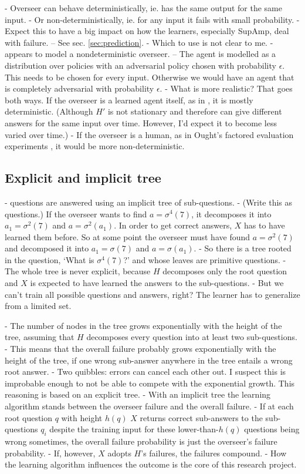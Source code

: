 \documentclass{farlamp}
\begin{document}
- Overseer can behave deterministically, ie. has the same output for the same
input.
- Or non-deterministically, ie. for any input it fails with small probability.
- Expect this to have a big impact on how the learners, especially SupAmp, deal
with failure. – See sec. \ref{sec:prediction}.
- \OQ Which to use is not clear to me.
    - \textcite{ChriRelAmp} appears to model a nondeterministic overseer. – The
    agent is modelled as a distribution over policies with an adversarial policy
    chosen with probability $\epsilon$. This needs to be chosen for every input.
    Otherwise we would have an agent that is completely adversarial with
    probability $\epsilon$.
    - What is more realistic? That goes both ways. If the overseer is a learned
    agent itself, as in \textcite{CSASupAmp}, it is mostly deterministic.
    (Although $H'$ is not stationary and therefore can give different answers
    for the same input over time. However, I'd expect it to become less varied
    over time.)
    - If the overseer is a human, as in Ought's factored evaluation experiments
    \parencite{StuhDelCog}, it would be more non-deterministic.


\subsection{Explicit and implicit tree}

- questions are answered using an implicit tree of sub-questions.
- (Write this as questions.) If the overseer wants to find $a = \sigma^4(7)$, it
decomposes it into $a_1 = \sigma^2(7)$ and $a = \sigma^2(a_1)$. In order to get
correct answers, $X$ has
to have learned them before. So at some point the overseer must have found $a =
\sigma^2(7)$ and decomposed it into $a_1 = \sigma(7)$ and $a = \sigma(a_1)$.
- So there is a tree rooted in the question, ‘What is $\sigma^4(7)$?’ and whose
leaves are primitive questions.
- The whole tree is never explicit, because $H$ decomposes only the root
question and $X$ is expected to have learned the answers to the sub-questions.
- But we can't train all possible questions and answers, right? The learner has
to generalize from a limited set.

- The number of nodes in the tree grows exponentially with the height of the
tree, assuming that $H$ decomposes every question into at least two
sub-questions.
- This means that the overall failure probably grows exponentially with the
height of the tree, if one wrong sub-answer anywhere in the tree entails a wrong
root answer.
- Two quibbles: errors can cancel each other out. I suspect this is improbable
enough to not be able to compete with the exponential growth. This reasoning is
based on an explicit tree.
- With an implicit tree the learning algorithm stands between the overseer
failure and the overall failure.
- If at each root question $q$ with height $h(q)$ $X$ returns correct
sub-answers to the sub-questions $q_i$ despite the training input for these
lower-than-$h(q)$ questions being wrong sometimes, the overall failure
probability is just the overseer's failure probability.
- If, however, $X$ adopts $H$'s failures, the failures compound.
- How the learning algorithm influences the outcome is the core of this research
project.
\end{document}
